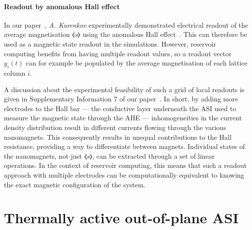 \paragraph{Readout by anomalous Hall effect}
In our paper~\cite{KUR-24}, \textit{A. Kurenkov} experimentally demonstrated electrical readout of the average magnetisation $\llangle s \rrangle$ using the anomalous Hall effect~\cite{AHE}.
This can therefore be used as a magnetic state readout in the simulations.
However, reservoir computing benefits from having multiple readout values, so a readout vector $y_i(t)$ can for example be populated by the average magnetisation of each lattice column $i$. \par %
A discussion about the experimental feasibility of such a grid of local readouts is given in Supplementary Information 7 of our paper~\cite{KUR-24}.
In short, by adding more electrodes to the Hall bar --- the conductive layer underneath the ASI used to measure the magnetic state through the AHE --- inhomogeneities in the current density distribution result in different currents flowing through the various nanomagnets.
This consequently results in unequal contributions to the Hall resistance, providing a way to differentiate between magnets.
Individual states of the nanomagnets, not just $\llangle s \rrangle$, can be extracted through a set of linear operations.
In the context of reservoir computing, this means that such a readout approach with multiple electrodes can be computationally equivalent to knowing the exact magnetic configuration of the system.


\section{Thermally active out-of-plane ASI}
